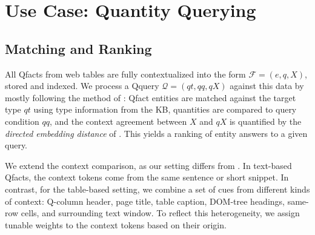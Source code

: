 \section{Use Case: Quantity Querying}
\label{sec:querying}
\subsection{Matching and Ranking}


\begin{comment}


In this section, we describe our quantity search system on web tables, built on top of the extraction model described in Sections \ref{sec:extract} and \ref{sec:qfact_scoring_model}. Figure \ref{fig:search_ov} shows the overview of our system, which contains two main phases: \textit{Extraction} and \textit{Search \& Ranking}.

\end{comment}

All Qfacts from web tables are fully contextualized into the form
$\mathcal{F} = (e,q,X)$, stored and indexed.
We process a Qquery $\mathcal{Q} = (qt,qq,qX)$
against this data
by mostly following the method of \cite{DBLP:conf/semweb/HoIPBW19}:
Qfact entities are matched against the target type $qt$ using type information from the KB, quantities are compared to query condition $qq$,
and the context agreement between $X$ and
$qX$ is quantified by the
{\em directed embedding distance} of \cite{DBLP:conf/semweb/HoIPBW19}.
This yields a ranking of entity answers to a given query.

We extend the context comparison, as our setting
differs from \cite{DBLP:conf/semweb/HoIPBW19}.
In text-based Qfacts, the context tokens come
from the same sentence or short snippet.
In contrast, for the table-based setting, we combine 
a set of cues from different kinds of context: Q-column header, page title, table caption, DOM-tree headings, same-row cells, and surrounding text window. 
To reflect this heterogeneity, we assign tunable weights
to the context tokens based on their origin. 

